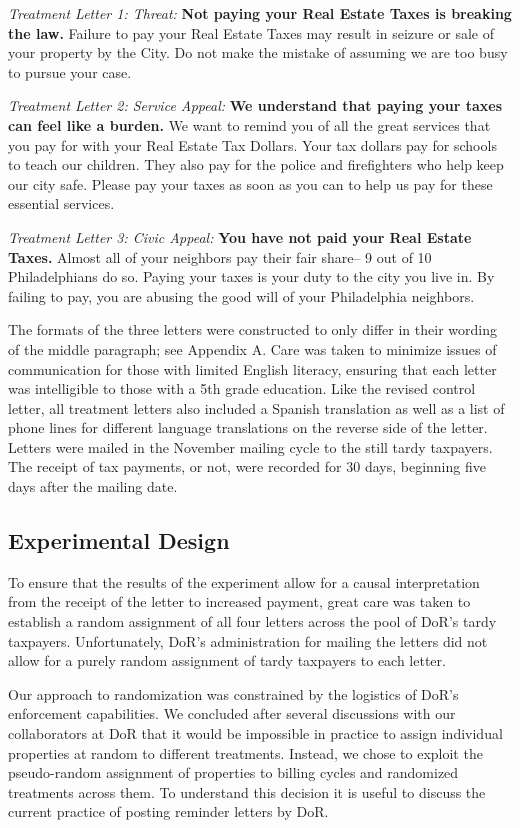 \documentclass[12pt,titlepage]{article}
\begin{document}
{\it Treatment Letter 1: Threat: } {\bf Not paying your Real Estate
  Taxes is breaking the law.} Failure to pay your Real Estate Taxes
may result in seizure or sale of your property by the City. Do not
make the mistake of assuming we are too busy to pursue your case.

{\it Treatment Letter 2: Service Appeal: } {\bf We understand that
  paying your taxes can feel like a burden.} We want to remind you of
all the great services that you pay for with your Real Estate Tax
Dollars. Your tax dollars pay for schools to teach our children.  They
also pay for the police and firefighters who help keep our city safe.
Please pay your taxes as soon as you can to help us pay for these
essential services.
  
{ \it Treatment Letter 3: Civic Appeal: } {\bf You have not paid your
  Real Estate Taxes.}  Almost all of your neighbors pay their fair
share-- 9 out of 10 Philadelphians do so. Paying your taxes is your
duty to the city you live in. By failing to pay, you are abusing the
good will of your Philadelphia neighbors.

The formats of the three letters were constructed to only differ in
their wording of the middle paragraph; see Appendix A.  Care was taken
to minimize issues of communication for those with limited English
literacy, ensuring that each letter was intelligible to those with a
5th grade education.  Like the revised control letter, all treatment
letters also included a Spanish translation as well as a list of phone
lines for different language translations on the reverse side of the
letter.  Letters were mailed in the November mailing cycle to the
still tardy taxpayers.  The receipt of tax payments, or not, were
recorded for 30 days, beginning five days after the mailing date.


\subsection{Experimental Design}

To ensure that the results of the experiment allow for a causal
interpretation from the receipt of the letter to increased payment,
great care was taken to establish a random assignment of all four
letters across the pool of DoR's tardy taxpayers.  Unfortunately,
DoR's administration for mailing the letters did not allow for a
purely random assignment of tardy taxpayers to each letter.  

Our approach to randomization was constrained by the logistics of
DoR's enforcement capabilities. We concluded after several discussions
with our collaborators at DoR that it would be  impossible in practice
to assign individual properties at random to different
treatments. Instead, we chose to exploit the pseudo-random assignment
of properties to billing cycles and randomized treatments across them.
To understand this decision it is useful to discuss the current
practice of posting reminder letters by DoR.
\end{document}

